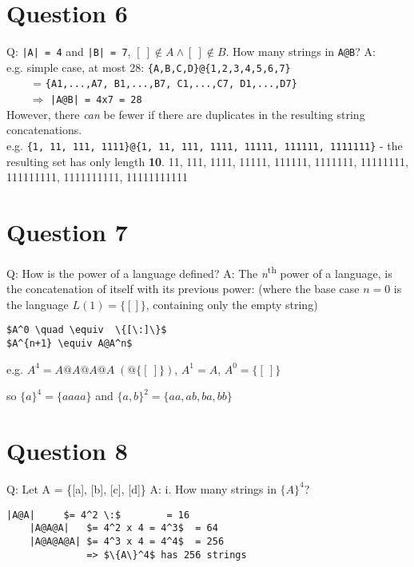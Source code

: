 \documentclass[english]{scrartcl}
\begin{document}
\section*{Question 6}
Q: \verb.|A| = 4. and \verb.|B| = 7., $[\:] \notin A \wedge [\:] \notin B$. How many strings in \verb.A@B.?
\newline
A: \\
e.g. simple case, at most 28: \verb~{A,B,C,D}@{1,2,3,4,5,6,7}~ \\
\verb|    | = \verb~{A1,...,A7, B1,...,B7, C1,...,C7, D1,...,D7}~ \\
\verb|    | $\Rightarrow$ \verb.|A@B| = 4x7 = 28.
\\
However, there \textit{can} be fewer if there are duplicates in the resulting string concatenations. \\
e.g. \verb~{1, 11, 111, 1111}@{1, 11, 111, 1111, 11111, 111111, 1111111}~ - the resulting set has only length \textbf{10}.
{11, 111, 1111, 11111, 111111, 1111111, 11111111, 111111111, 1111111111, 11111111111}

\section*{Question 7}
Q: How is the power of a language defined?
\newline
A: The \textit{n}\textsuperscript{th} power of a language, is the concatenation of itself with its previous power:
(where the base case $n=0$ is the language $L(1)=\{[]\}$, containing only the empty string)

\begin{Verbatim}[mathescape,commandchars=\\\{\}]
$A^0 \quad \equiv  \{[\:]\}$
$A^{n+1} \equiv A@A^n$
\end{Verbatim}

e.g. $A^4 = A @ A @ A @ A \; (@ \{[\:]\})$, $A^1 = A$, $A^0 = \{[\:]\}$

\quad so $\{a\}^4 = \{aaaa\}$ and $\{a,b\}^2 = \{aa, ab, ba, bb\}$

\section*{Question 8}
Q: Let A = \{[a], [b], [c], [d]\}
\newline
A: i. How many strings in $\{A\}^4$?

\begin{Verbatim}[mathescape,commandchars=\\\{\}]
    |A@A|     $= 4^2 \:$        = 16
    |A@A@A|   $= 4^2 x 4 = 4^3$  = 64
    |A@A@A@A| $= 4^3 x 4 = 4^4$  = 256
              => $\{A\}^4$ has 256 strings
\end{Verbatim}
\end{document}
